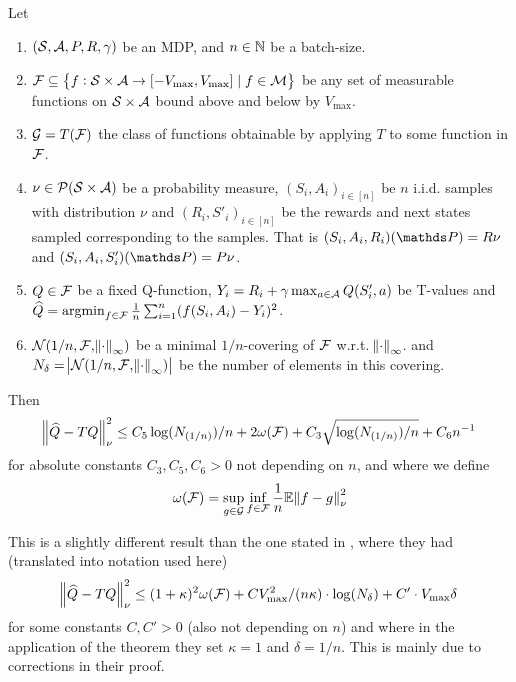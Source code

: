 
\begin{thm}\label{thm:oneStep}
  Let
  \begin{enumerate}
    \item $(\mathcal{S}, \mathcal{A}, P, R, \gamma)$ be an MDP,
      and $n \in \mathbb{N}$ be a batch-size.
    \item $\mathcal{F} \subseteq 
      \left\{ f : \mathcal{S} \times \mathcal{A} \to [-V_{\max}, V_{\max}]
      \mid f \in \mathcal{M} \right\}$
      be any set of measurable functions on $\mathcal{S} \times \mathcal{A}$
      bound above and below by $V_{\max}$.
    \item $\mathcal{G} = T(\mathcal{F})$ the class of functions obtainable by
      applying $T$ to some function in $\mathcal{F}$.
    \item $\nu \in \mathcal{P}(\mathcal{S} \times \mathcal{A})$ be a probability measure,
      $(S_i, A_i)_{i\in[n]}$ be $n$ i.i.d. samples with distribution
      $\nu$ and $(R_i, S'_i)_{i\in[n]}$ be the rewards and next states sampled
      corresponding to the samples.
      That is $(S_i, A_i, R_i)(\Prob) = R \nu$
      and $(S_i, A_i, S'_i)(\Prob) = P \nu$. 
    \item $Q \in \mathcal{F}$ be a fixed Q-function,
      $Y_i = R_i + \gamma \max_{a \in \mathcal{A}} Q(S'_i, a)$ be
      T-values and
      \\$\widehat{Q} = \operatorname*{argmin}_{f \in \mathcal{F}} \frac{1}{n}
      \sum_{i=1}^n (f(S_i, A_i) - Y_i)^2$.
    \item $\mathcal{N}(1/n, \mathcal{F}, \norm{\cdot}_\infty)$
      be a minimal $1/n$-covering of $\mathcal{F}$ w.r.t. $\norm{\cdot}_\infty$.
      and $N_\delta = \abs{\mathcal{N}(1/n, \mathcal{F}, \norm{\cdot}_\infty)}$
      be the number of elements in this covering.
  \end{enumerate}
  Then
  \begin{align*}
    \norm{\widehat{Q} - TQ}_\nu^2
    \leq C_5 \log(N_{(1/n)})/n
    + 2 \omega(\mathcal{F})
    + C_3 \sqrt{\log(N_{(1/n)})/n} + C_6 n^{-1}
  \end{align*}
  for absolute constants $C_3, C_5, C_6 > 0$ not depending on
  $n$, and where we define
  \begin{equation}
    \omega(\mathcal{F}) = \sup_{g \in \mathcal{G}} \inf_{f \in \mathcal{F}}
    \frac{1}{n} \mathbb{E} \norm{f - g}_\nu^2
    \label{eq:defomega}
  \end{equation}
\end{thm}

\begin{rem}
This is a slightly different result than the one stated in ,
where they had (translated into notation used here)
\begin{equation}
  \norm{\widehat{Q} - TQ}_\nu^2
  \leq (1+\kappa)^2 \omega(\mathcal{F}) + C V_{\max}^2/(n \kappa)
  \cdot \log (N_\delta) + C'\cdot V_{\max} \delta
  \label{eq:onestepFan}
\end{equation}
for some constants $C, C'>0$ (also not depending on $n$) and where
in the application of the theorem they set
$\kappa = 1$ and $\delta = 1/n$.
This is mainly due to corrections in their proof.
\end{rem}

